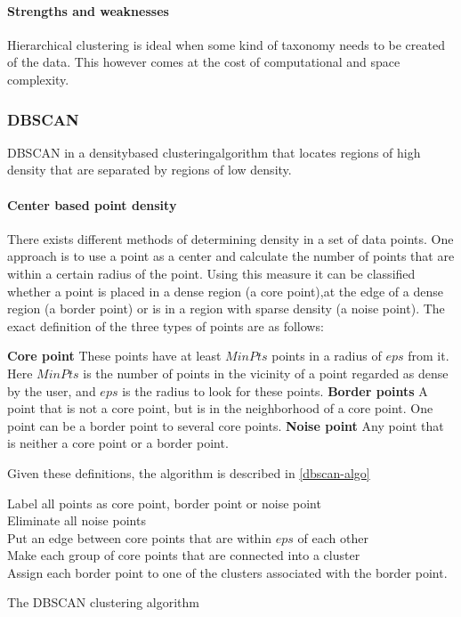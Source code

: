 \paragraph{Strengths and weaknesses}
Hierarchical clustering is ideal when some kind of taxonomy needs to be created of the data.
This however comes at the cost of computational and space complexity.

\subsubsection{DBSCAN}\label{clustering:DBSCAN}
DBSCAN in a densitybased clusteringalgorithm that locates regions of high density that are separated by regions of low density.

\paragraph{Center based point density}
There exists different methods of determining density in a set of data points.
One approach is to use a point as a center and calculate the number of points that are within a certain radius of the point.
Using this measure it can be classified whether a point is placed in a dense region (a core point),at the edge of a dense region (a border point) or is in a region with sparse density (a noise point).
The exact definition of the three types of points are as follows:\cite{pang2006introduction}

\textbf{Core point} These points have at least $ MinPts $ points in a radius of $ eps $ from it. 
Here $ MinPts $ is the number of points in the vicinity of a point regarded as dense by the user, and $ eps $ is the radius to look for these points.
\textbf{Border points} A point that is not a core point, but is in the neighborhood of a core point. 
One point can be a border point to several core points.
\textbf{Noise point} Any point that is neither a core point or a border point. 

Given these definitions, the algorithm is described in \cref{dbscan-algo}

\begin{algorithm}
Label all points as core point, border point or noise point \\
Eliminate all noise points \\
Put an edge between core points that are within $ eps $ of each other \\
Make each group of core points that are connected into a cluster \\
Assign each border point to one of the clusters associated with the border point. 
\caption{The DBSCAN clustering algorithm}\label{dbscan-algo}
\end{algorithm}

